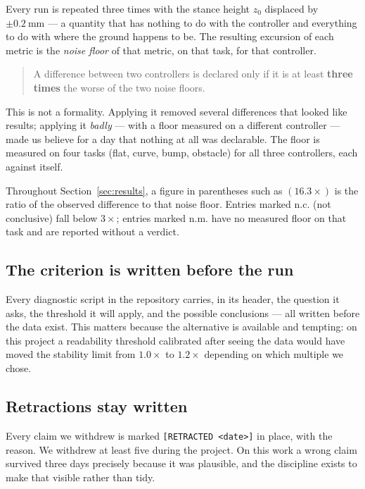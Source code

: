 \documentclass[11pt,a4paper]{article}
\begin{document}
Every run is repeated three times with the stance height $z_0$ displaced by
$\pm\SI{0.2}{\milli\meter}$ --- a quantity that has nothing to do with the
controller and everything to do with where the ground happens to be. The
resulting excursion of each metric is the \emph{noise floor} of that metric,
on that task, for that controller.

\begin{quote}
A difference between two controllers is declared only if it is at least
\textbf{three times} the worse of the two noise floors.
\end{quote}

This is not a formality. Applying it removed several differences that looked
like results; applying it \emph{badly} --- with a floor measured on a
different controller --- made us believe for a day that nothing at all was
declarable. The floor is measured on four tasks (flat, curve, bump, obstacle)
for all three controllers, each against itself.

Throughout Section~\ref{sec:results}, a figure in parentheses such as
$(16.3\times)$ is the ratio of the observed difference to that noise floor.
Entries marked \textsf{n.c.} (not conclusive) fall below $3\times$; entries
marked \textsf{n.m.} have no measured floor on that task and are reported
without a verdict.

\subsection{The criterion is written before the run}

Every diagnostic script in the repository carries, in its header, the question
it asks, the threshold it will apply, and the possible conclusions --- all
written before the data exist. This matters because the alternative is
available and tempting: on this project a readability threshold calibrated
after seeing the data would have moved the stability limit from $1.0\times$ to
$1.2\times$ depending on which multiple we chose.

\subsection{Retractions stay written}

Every claim we withdrew is marked \texttt{[RETRACTED \textless date\textgreater]}
in place, with the reason. We withdrew at least five during the project. On
this work a wrong claim survived three days precisely because it was
plausible, and the discipline exists to make that visible rather than tidy.
\end{document}
